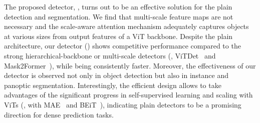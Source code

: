 The proposed detector, \ours, turns out to be an effective solution for the plain detection and segmentation. We find that multi-scale feature maps are not necessary and the scale-aware attention mechanism adequately captures objects at various sizes from output features of a ViT backbone. Despite the plain architecture, our detector (\ours) shows competitive performance compared to the strong hierarchical-backbone or multi-scale detectors (\eg, ViTDet~\cite{li2022vitdet} and Mask2Former~\cite{cheng2022mask2former}), while being consistently faster. Moreover, the effectiveness of our detector is observed not only in object detection but also in instance and panoptic segmentation. Interestingly, the efficient design allows \ours to take advantages of the significant progress in self-supervised learning and scaling with ViTs (\eg, with MAE~\cite{he2022mae} and BEiT~\cite{peng2022beitv2}), indicating plain detectors to be a promising direction for dense prediction tasks.